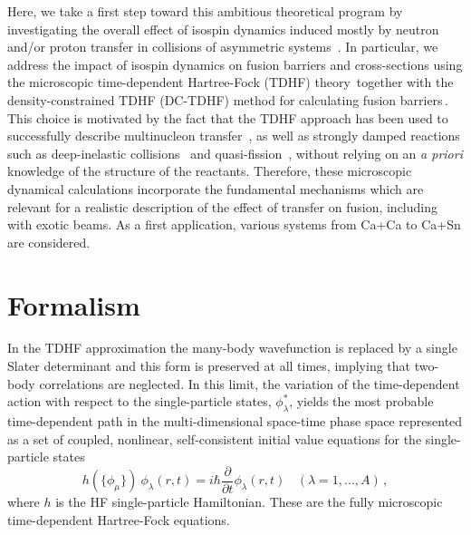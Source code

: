 Here, we take a first step toward this ambitious theoretical program by investigating the overall effect of isospin dynamics induced mostly by neutron and/or proton transfer in collisions of asymmetric systems~\citep{dasso1985,chomaz1993,baran1996,baran2001,simenel2001,baran2005,simenel2007,baran2009,oberacker2012,umar2008a}.
In particular, we address the impact of isospin dynamics on fusion barriers and cross-sections using
the microscopic
time-dependent Hartree-Fock (TDHF) theory\,\citep{negele1982,simenel2012}
together with the density-constrained TDHF (DC-TDHF) method for calculating fusion barriers\,\citep{umar2006b}.
This choice is motivated by the fact that the TDHF approach has been used to successfully describe multinucleon transfer~\citep{simenel2010,simenel2012b,sekizawa2013,scamps2013a,bourgin2016}, as well as strongly damped reactions such as deep-inelastic collisions~\citep{koonin1977,simenel2011} and quasi-fission~\citep{wakhle2014,umar2015a,umar2016}, without relying on an {\it a priori} knowledge of the structure of the reactants.
Therefore, these microscopic dynamical calculations incorporate the fundamental mechanisms which are relevant for a realistic description of the effect of transfer on fusion, including with exotic beams.
As a first application, various systems from Ca+Ca to Ca+Sn are considered.

\section{Formalism}

In the TDHF approximation the many-body wavefunction is replaced by a single
Slater determinant and this form is preserved at all times, implying that two-body correlations
are neglected.
In this limit, the
variation of the time-dependent action with respect to the single-particle states, $\phi^{*}_{\lambda}$, yields the most probable time-dependent path
in the multi-dimensional space-time phase space
represented as a
set of coupled, nonlinear, self-consistent initial value equations
for the single-particle states
\begin{equation}
h(\{\phi_{\mu}\}) \ \phi_{\lambda} (r,t) = i \hbar \frac{\partial}{\partial t} \phi_{\lambda} (r,t)
\ \ \ \ (\lambda = 1,...,A)\,,
\end{equation}
where $h$ is the HF single-particle Hamiltonian.
These are the fully microscopic time-dependent Hartree-Fock equations.

